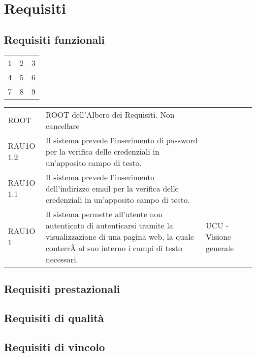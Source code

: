 \section{Requisiti }

\subsection{Requisiti funzionali }

\begin{tabular}{ l | c | r }
  1 & 2 & 3 \\
  4 & 5 & 6 \\
  7 & 8 & 9 \\
\end{tabular}

\begin{tabular}{ l | l | l }
ROOT & ROOT dell'Albero dei Requisiti. Non cancellare & \\
RAU1O 1.2 & Il sistema prevede l'inserimento di password per la verifica delle credenziali in un'apposito campo di testo. & \\
RAU1O 1.1 & Il sistema prevede l'inserimento dell'indirizzo email per la verifica delle credenziali in un'apposito campo di testo. & \\
RAU1O 1 & Il sistema permette all'utente non autenticato di autenticarsi tramite la visualizzazione di una pagina web, la quale conterrÃ  al suo interno i campi di testo necessari. & UCU - Visione generale\ \\
\end{tabular}

\subsection{Requisiti prestazionali }
\subsection{Requisiti di qualità }
\subsection{Requisiti di vincolo }